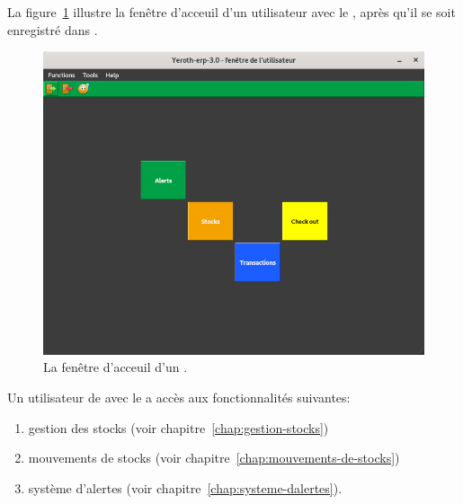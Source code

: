 \label{sec:utilisateurs-lemagasinier}

La figure~\ref{fig:yeren-fenetre-magasinier} illustre
la fen\^etre d'acceuil d'un utilisateur avec le
\role \magasinier, apr\`es qu'il se soit enregistr\'e
dans \yeren.\\

\begin{figure}[!htbp]
\centering
\includegraphics[scale=0.63]{images/yeren-fenetre-magasinier.png}
\caption{La fen\^etre d'acceuil d'un \magasinier.}
\label{fig:yeren-fenetre-magasinier}
\end{figure}

Un utilisateur de \yeren avec le \role \magasinier a acc\`es
aux fonctionnalit\'es suivantes:

\begin{enumerate}[1)]
	\item gestion des stocks (voir chapitre~\ref{chap:gestion-stocks})
	\item mouvements de stocks (voir chapitre~\ref{chap:mouvements-de-stocks})	
	\item syst\`eme d'alertes (voir chapitre~\ref{chap:systeme-dalertes}).\\
\end{enumerate}
